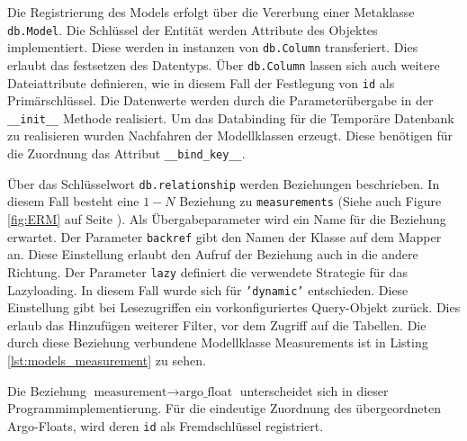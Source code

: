     
Die Registrierung des Models erfolgt über die Vererbung einer Metaklasse \texttt{db.Model}. Die Schlüssel der Entität werden Attribute des Objektes implementiert. Diese werden in instanzen von \texttt{db.Column} transferiert. Dies erlaubt das festsetzen des Datentyps. Über \texttt{db.Column} lassen sich auch weitere Dateiattribute definieren, wie in diesem Fall der Festlegung von \texttt{id} als Primärschlüssel. Die Datenwerte werden durch die Parameterübergabe in der \texttt{\_\_init\_\_} Methode realisiert.  
Um das Databinding für die Temporäre Datenbank zu realisieren wurden Nachfahren der Modellklassen erzeugt. Diese benötigen für die Zuordnung das Attribut \texttt{\_\_bind\_key\_\_}.


Über das Schlüsselwort \texttt{db.relationship} werden Beziehungen beschrieben. In diesem Fall besteht eine $1 - N$ Beziehung zu \texttt{measurements} (Siehe auch Figure \ref{fig:ERM} auf Seite \pageref{fig:ERM}). Als Übergabeparameter wird ein Name für die Beziehung erwartet. Der Parameter \texttt{backref} gibt den Namen der Klasse auf dem Mapper an. Diese Einstellung erlaubt den Aufruf der Beziehung auch in die andere Richtung. Der Parameter \texttt{lazy} definiert die verwendete Strategie für das Lazyloading. In diesem Fall wurde sich für \texttt{'dynamic'} entschieden. Diese Einstellung gibt bei Lesezugriffen ein vorkonfiguriertes Query-Objekt zurück. Dies erlaub das Hinzufügen weiterer Filter, vor dem Zugriff auf die Tabellen. Die durch diese Beziehung verbundene Modellklasse Measurements ist in Listing \ref{lst:models_measurement} zu sehen.

   
Die Beziehung $\mbox{measurement} \to \mbox{argo\_float}$ unterscheidet sich in dieser Programmimplementierung. Für die eindeutige Zuordnung des übergeordneten Argo-Floats, wird deren \texttt{id} als Fremdschlüssel registriert.  \\




